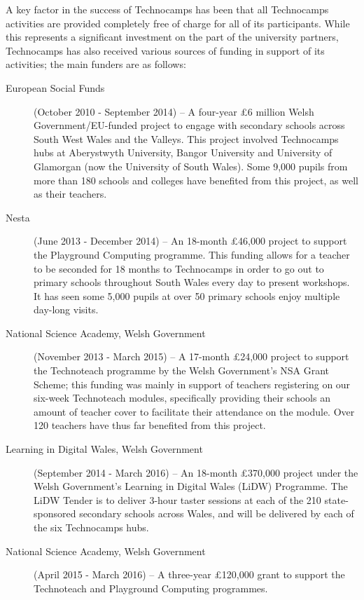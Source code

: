 \documentclass{sig-alternate}
\begin{document}
A key factor in the success of Technocamps has been that all
Technocamps activities are provided completely free of charge for all
of its participants. While this represents a significant investment on
the part of the university partners, Technocamps has also received
various sources of funding in support of its activities; the main
funders are as follows:

\begin{description}
\item[European Social Funds] (October 2010 - September 2014) --
A four-year \pounds 6 million Welsh Government/EU-funded project to
engage with secondary schools across South West Wales and the
Valleys. This project involved Technocamps hubs at Aberystwyth
University, Bangor University and University of Glamorgan (now the
University of South Wales). Some 9,000 pupils from more than 180
schools and colleges have benefited from this project, as well as
their teachers.

\item[Nesta] (June 2013 - December 2014) --
An 18-month \pounds 46,000 project to support the Playground Computing
programme. This funding allows for a teacher to be seconded for 18
months to Technocamps in order to go out to primary schools throughout
South Wales every day to present workshops. It has seen some 5,000
pupils at over 50 primary schools enjoy multiple day-long visits.

\item[National Science Academy, Welsh Government] (November 2013 - March 2015) --
A 17-month \pounds 24,000 project to support the Technoteach programme
by the Welsh Government's NSA Grant Scheme; this funding was mainly in
support of teachers registering on our six-week Technoteach modules,
specifically providing their schools an amount of teacher cover to
facilitate their attendance on the module. Over 120 teachers have thus
far benefited from this project.

\item[Learning in Digital Wales, Welsh Government] (September 2014 - March 2016) --
An 18-month \pounds 370,000 project under the Welsh Government's
Learning in Digital Wales (LiDW) Programme. The LiDW Tender is to
deliver 3-hour taster sessions at each of the 210 state-sponsored
secondary schools across Wales, and will be delivered by each of the
six Technocamps hubs.

\item[National Science Academy, Welsh Government] (April 2015 - March 2016) -- 
A three-year \pounds 120,000 grant to support the Technoteach and
Playground Computing programmes.
\end{description}
\end{document}
